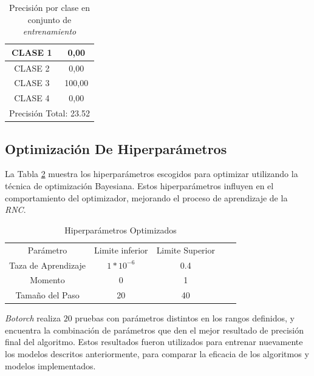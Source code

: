 \begin{table}[htbp]
	\centering
	\begin{tabular}{|c|c|}
		\hline
		CLASE 1 & 0,00 \bigstrut\\
		\hline
		CLASE 2 & 0,00 \bigstrut\\
		\hline
		CLASE 3 & 100,00 \bigstrut\\
		\hline
		CLASE 4 & 0,00 \bigstrut\\
		\hline
		\multicolumn{2}{|c|}{Precisión Total: 23.52} \bigstrut\\
		\hline
	\end{tabular}%
	\caption{Precisión por clase en conjunto de \textit{entrenamiento}}
	\label{clase_RESNET18_2}
\end{table}%

\subsection{Optimización De Hiperparámetros}

La Tabla \ref{paraopt} muestra los hiperparámetros escogidos para optimizar utilizando la técnica de optimización Bayesiana. Estos hiperparámetros influyen en el comportamiento del optimizador, mejorando el proceso de aprendizaje de la \textit{RNC}.  

\begin{table}[ht]
	\centering
	\begin{tabular}{|c|c|c|ll}
		\cline{1-3}
		Parámetro & Limite inferior              & Limite Superior &  &  \\ \cline{1-3}
		Taza de Aprendizaje        & $1*10^{-6}$ & 0.4             &  &  \\ \cline{1-3}
		Momento   & 0                            & 1               &  &  \\ \cline{1-3}
		Tamaño del Paso   & 20                           & 40              &  &  \\ \cline{1-3}
	\end{tabular}
	\caption{Hiperparámetros Optimizados}
	\label{paraopt}
\end{table}

\textit{Botorch} realiza $20$ pruebas con parámetros distintos en los rangos definidos, y encuentra la combinación de parámetros que den el mejor resultado de precisión final del algoritmo. Estos resultados fueron utilizados para entrenar nuevamente los modelos descritos anteriormente, para comparar la eficacia de los algoritmos y modelos implementados.
	
